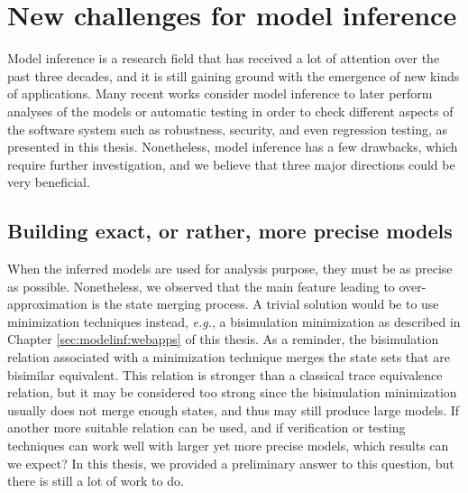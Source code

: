 \section{New challenges for model inference}
\label{sec:conclusion:modelinf}

Model inference is a research field that has received a lot of
attention over the past three decades, and it is still gaining
ground with the emergence of new kinds of applications. Many
recent works consider model inference to later perform analyses
of the models or automatic testing in order to check different
aspects of the software system such as robustness, security, and
even regression testing, as presented in this thesis.
Nonetheless, model inference has a few drawbacks, which require
further investigation, and we believe that three major directions
could be very beneficial.

\subsection{Building exact, or rather, more precise models}
\label{sec:conclusion:modelinf:exact}

When the inferred models are used for analysis purpose, they must be as
precise as possible. Nonetheless, we observed that the main
feature leading to over-approximation is the state merging
process. A trivial solution would be to use minimization
techniques instead, \emph{e.g.}, a bisimulation minimization as
described in Chapter \ref{sec:modelinf:webapps} of this thesis.
As a reminder, the bisimulation relation associated with a
minimization technique merges the state sets that are bisimilar
equivalent. This relation is stronger than a classical trace
equivalence relation, but it may be considered too strong since the
bisimulation minimization usually does not merge enough states,
and thus may still produce large models. If another more suitable
relation can be used, and if verification or testing techniques
can work well with larger yet more precise models, which results
can we expect? In this thesis, we provided a preliminary answer
to this question, but there is still a lot of work to do.

